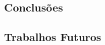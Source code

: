 \documentclass[article]{abntex2}
\begin{document}
\subsection{Conclusões}
\subsection{Trabalhos Futuros}





\nocite{Auer:2019}
\nocite{Tiburski:2019}
\nocite{Li:2019}
\nocite{Karmakar:2019}
\nocite{Oliveira:2018}
\nocite{Das:2018}
\nocite{Alphand:2018}
\nocite{Novo:2018}
\nocite{Stergiou:2017}
\nocite{Minoli:2017}
\end{document}
